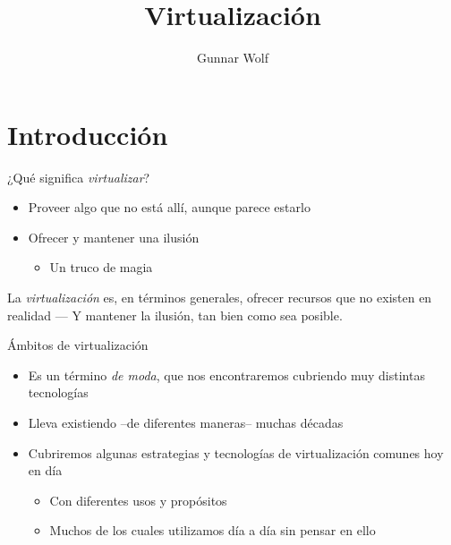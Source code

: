 \documentclass[presentation]{beamer}
\author{Gunnar Wolf}
\date{}
\title{Virtualización}
\begin{document}
\maketitle

\section{Introducción}
\label{sec:org93ab1e7}
\begin{frame}[label={sec:org526199d}]{¿Qué significa \emph{virtualizar}?}
\begin{itemize}
\item Proveer algo que no está allí, aunque parece estarlo
\item Ofrecer y mantener una ilusión
\begin{itemize}
\item Un truco de magia
\end{itemize}
\end{itemize}

\begin{center}
La \emph{virtualización} es, en términos generales, ofrecer recursos que no
existen en realidad — Y mantener la ilusión, tan bien como sea
posible.
\end{center}
\end{frame}

\begin{frame}[label={sec:org61472d6}]{Ámbitos de virtualización}
\begin{itemize}
\item Es un término \emph{de moda}, que nos encontraremos cubriendo muy
distintas tecnologías
\item Lleva existiendo –de diferentes maneras– muchas décadas
\item Cubriremos algunas estrategias y tecnologías de virtualización
comunes hoy en día
\begin{itemize}
\item Con diferentes usos y propósitos
\item Muchos de los cuales utilizamos día a día sin pensar en ello
\end{itemize}
\end{itemize}
\end{frame}
\end{document}
